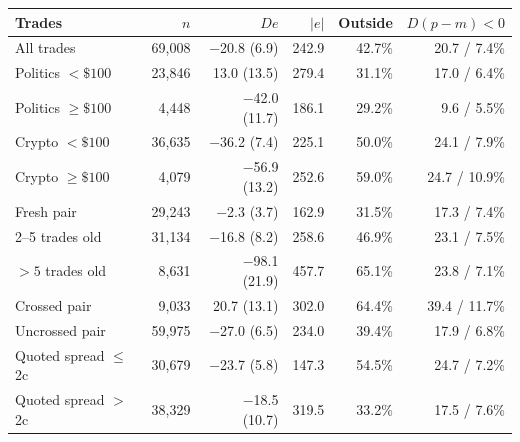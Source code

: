 \begin{tabular}{lrrrrr}
\toprule
Trades & $n$ & $De$ & $|e|$ & Outside & $D(p-m)<0$ \\
\midrule
All trades & 69,008 & \ensuremath{-}20.8 (6.9) & 242.9 & 42.7\% & 20.7 / 7.4\% \\
\addlinespace
Politics $<\$100$ & 23,846 & 13.0 (13.5) & 279.4 & 31.1\% & 17.0 / 6.4\% \\
Politics $\ge\$100$ & 4,448 & \ensuremath{-}42.0 (11.7) & 186.1 & 29.2\% & 9.6 / 5.5\% \\
Crypto $<\$100$ & 36,635 & \ensuremath{-}36.2 (7.4) & 225.1 & 50.0\% & 24.1 / 7.9\% \\
Crypto $\ge\$100$ & 4,079 & \ensuremath{-}56.9 (13.2) & 252.6 & 59.0\% & 24.7 / 10.9\% \\
\addlinespace
Fresh pair & 29,243 & \ensuremath{-}2.3 (3.7) & 162.9 & 31.5\% & 17.3 / 7.4\% \\
2--5 trades old & 31,134 & \ensuremath{-}16.8 (8.2) & 258.6 & 46.9\% & 23.1 / 7.5\% \\
$>5$ trades old & 8,631 & \ensuremath{-}98.1 (21.9) & 457.7 & 65.1\% & 23.8 / 7.1\% \\
\addlinespace
Crossed pair & 9,033 & 20.7 (13.1) & 302.0 & 64.4\% & 39.4 / 11.7\% \\
Uncrossed pair & 59,975 & \ensuremath{-}27.0 (6.5) & 234.0 & 39.4\% & 17.9 / 6.8\% \\
\addlinespace
Quoted spread $\le$2c & 30,679 & \ensuremath{-}23.7 (5.8) & 147.3 & 54.5\% & 24.7 / 7.2\% \\
Quoted spread $>$2c & 38,329 & \ensuremath{-}18.5 (10.7) & 319.5 & 33.2\% & 17.5 / 7.6\% \\
\bottomrule
\end{tabular}
